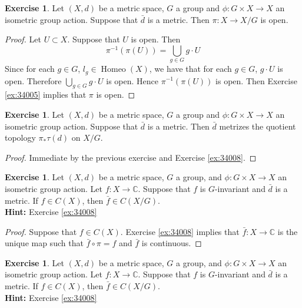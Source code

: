 \documentclass[12pt]{amsart}
\theoremstyle{definition}
\newtheorem{ex}[definition]{Exercise}
\newcommand{\C}{\mathbb{C}}
\DeclareMathOperator{\Homeo}{Homeo}
\newcommand{\rex}[1]{Exercise \ref{ex:#1}}
\begin{document}
	\begin{ex}
	Let $(X,d)$ be a metric space, $G$ a group and $\phi: G \times X \rightarrow X$ an isometric group action. Suppose that $\bar{d}$ is a metric. Then $\pi:X \rightarrow X/G$ is open.
	\end{ex}
	
	\begin{proof}
	Let $U \subset X$. Suppose that $U$ is open. Then 
	\begin{equation*}
	\pi^{-1}(\pi(U)) = \bigcup_{g \in G} g \cdot U
	\end{equation*}		
	Since for each $g \in G$, $l_g \in \Homeo(X)$, we have that for each $g \in G$, $g \cdot U$ is open. Therefore $\bigcup\limits_{g \in G} g \cdot U$ is open. Hence $\pi^{-1}(\pi(U))$ is open. Then \rex{34005} implies that $\pi$ is open.
	\end{proof}
	
	\begin{ex}
	Let $(X,d)$ be a metric space, $G$ a group and $\phi: G \times X \rightarrow X$ an isometric group action. Suppose that $\bar{d}$ is a metric. Then $\bar{d}$ metrizes the quotient topology $\pi_*\tau(d)$ on $X/G$.
	\end{ex}
	
	\begin{proof}
	Immediate by the previous exercise and \rex{34008}.
	\end{proof}
	
	\begin{ex}
	Let $(X, d)$ be a metric space, $G$ a group, and $\phi: G \times X \rightarrow X$ an isometric group action. Let $f: X \rightarrow \C$. Suppose that $f$ is $G$-invariant and $\bar{d}$ is a metric. If $f \in C(X)$, then $\bar{f} \in C(X/G)$.  \\
	\textbf{Hint:} \rex{34008}
	\end{ex}
	
	\begin{proof}
	Suppose that $f \in C(X)$. \rex{34008} implies that $\bar{f}: X \rightarrow \C$ is the unique map such that $\bar{f} \circ \pi = f$ and $\bar{f}$ is continuous. 
	\end{proof}
	
	\begin{ex}
	Let $(X, d)$ be a metric space, $G$ a group, and $\phi: G \times X \rightarrow X$ an isometric group action. Let $f: X \rightarrow \C$. Suppose that $f$ is $G$-invariant and $\bar{d}$ is a metric. If $f \in C(X)$, then $\bar{f} \in C(X/G)$.  \\
	\textbf{Hint:} \rex{34008}
	\end{ex}
	
\end{document}

